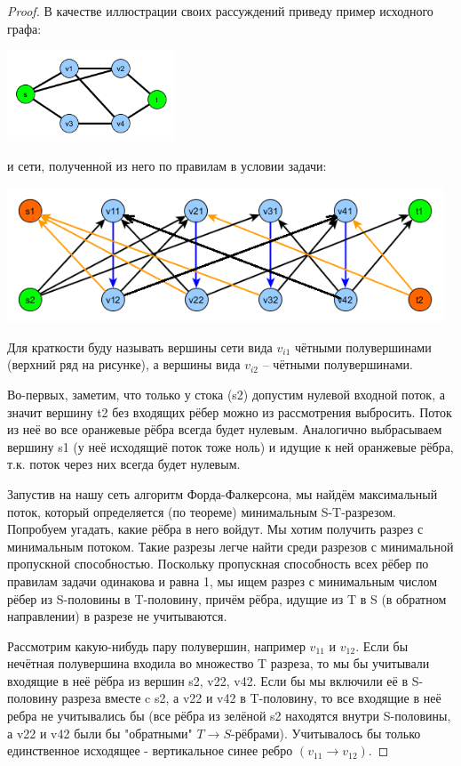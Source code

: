 \documentclass[a4paper,12pt]{article}
\numberwithin{figure}{section}
\theoremstyle{remark}
\begin{document}
\begin{proof}
	В качестве иллюстрации своих рассуждений приведу пример исходного графа:
	
	\includegraphics[width=5cm]{flow-problem-step-12-fig1.png}
	
	и сети, полученной из него по правилам в условии задачи:
	
	\includegraphics[width=13cm]{flow-problem-step-12-fig2.png}
	
	Для краткости буду называть вершины сети вида $v_{i1}$ чётными полувершинами (верхний ряд на рисунке), а вершины вида $v_{i2}$ -- чётными полувершинами.
	
	Во-первых, заметим, что только у стока (s2) допустим нулевой входной поток, а значит вершину t2 без входящих рёбер можно из рассмотрения выбросить. Поток из неё во все оранжевые рёбра всегда будет нулевым. Аналогично выбрасываем вершину s1 (у неё исходящиё поток тоже ноль) и идущие к ней оранжевые рёбра, т.к. поток через них всегда будет нулевым.
	
	Запустив на нашу сеть алгоритм Форда-Фалкерсона, мы найдём максимальный поток, который определяется (по теореме) минимальным S-T-разрезом. Попробуем угадать, какие рёбра в него войдут. Мы хотим получить разрез с минимальным потоком. Такие разрезы легче найти среди разрезов с минимальной пропускной способностью. Поскольку пропускная способность всех рёбер по правилам задачи одинакова и равна 1, мы ищем разрез с минимальным числом рёбер из S-половины в T-половину, причём рёбра, идущие из T в S (в обратном направлении) в разрезе не учитываются.
	
	Рассмотрим какую-нибудь пару полувершин, например $v_{11}$ и $v_{12}$. Если бы нечётная полувершина входила во множество T разреза, то мы бы учитывали входящие в неё рёбра из вершин s2, v22, v42. Если бы мы включили её в S-половину разреза вместе c s2, а v22 и v42 в T-половину, то все входящие в неё ребра не учитывались бы (все рёбра из зелёной s2 находятся внутри S-половины, а v22 и v42 были бы "обратными" $T \rightarrow S$-рёбрами). Учитывалось бы только единственное исходящее - вертикальное синее ребро $(v_{11} \rightarrow v_{12})$.
	

\end{proof}
\end{document}
